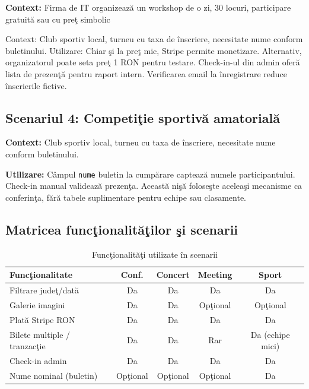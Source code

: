 \textbf{Context:} Firma de IT organizeaz\u a un workshop de o zi, 30 locuri, participare gratuit\u a sau cu pre\c t simbolic

Context: Club sportiv local, turneu cu taxa de \^inscriere, necesitate nume conform buletinului.
{Utilizare:} Chiar \c si la pre\c t mic, Stripe permite monetizare. Alternativ, organizatorul poate
seta pre\c t 1 RON pentru testare. Check-in-ul din admin ofer\u a lista de prezen\c t\u a pentru raport intern. Verificarea email la \^inregistrare reduce \^inscrierile fictive.

\subsection{Scenariul 4: Competi\c tie sportiv\u a amatorial\u a}

\textbf{Context:} Club sportiv local, turneu cu taxa de \^inscriere, necesitate nume conform buletinului.

\textbf{Utilizare:} C\^ampul \texttt{nume} buletin la cump\u arare capteaz\u a numele participantului. Check-in manual valideaz\u a prezen\c ta. Aceast\u a ni\c s\u a folose\c ste acelea\c si mecanisme ca conferin\c ta, f\u ar\u a tabele suplimentare pentru echipe sau clasamente. 

\subsection{Matricea func\c tionalit\u a\c tilor \c si scenarii}

\begin{table}[htbp]
	\centering
	\begin{tabular}{|l|c|c|c|c|}
		\hline
		\textbf{Func\c tionalitate} & \textbf{Conf.} & \textbf{Concert} & \textbf{Meeting} & \textbf{Sport} \\ \hline
		Filtrare jude\c t/dat\u a & Da & Da & Da & Da \\ \hline
		Galerie imagini & Da & Da & Op\c tional & Op\c tional \\ \hline
		Plat\u a Stripe RON & Da & Da & Da & Da \\ \hline
		Bilete multiple / tranzac\c tie & Da & Da & Rar & Da (echipe mici) \\ \hline
		Check-in admin & Da & Da & Da & Da \\ \hline
		Nume nominal (buletin) & Op\c tional & Op\c tional & Op\c tional & Da \\ \hline
	\end{tabular}
	\caption{Func\c tionalit\u a\c ti utilizate \^in scenarii}
	\label{tab:functionalitati_scenarii}
\end{table}

